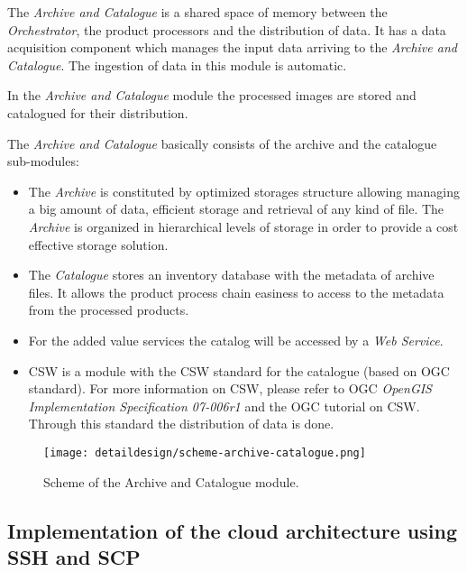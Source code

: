 The \emph{Archive and Catalogue} is a shared space of memory between the
\emph{Orchestrator}, the product processors and the distribution of data. It has
a data acquisition component which manages the input data arriving to the
\emph{Archive and Catalogue}. The ingestion of data in this module is automatic.

In the \emph{Archive and Catalogue} module the processed images are stored and catalogued for their distribution.

The \emph{Archive and Catalogue} basically consists of the archive and the
catalogue sub-modules:
\begin{itemize}
\item The \emph{Archive} is constituted by optimized storages structure allowing managing a big amount of data, efficient storage and retrieval of any kind of file. The \emph{Archive} is organized in hierarchical levels of storage in order to provide a cost effective storage solution.

\item The \emph{Catalogue} stores an inventory database with the metadata of archive files. It allows the product process chain easiness to access to the metadata from the processed products.

\item For the added value services the catalog will be accessed by a \emph{Web Service}.

\item \ac{CSW} is a module with the \ac{CSW} standard for the catalogue (based on \ac{OGC} standard). For more information on \ac{CSW}, please refer to \ac{OGC} \emph{OpenGIS Implementation Specification 07-006r1} and the \ac{OGC} tutorial on \ac{CSW}. Through this standard the distribution of data is done.
\end{itemize}

\begin{figure}[!h]
\begin{center}
\texttt{[image: detaildesign/scheme-archive-catalogue.png]}
\caption{Scheme of the Archive and Catalogue module.}
\label{fig:archive-catalogue-scheme}
\end{center}
\end{figure}



\subsection{Implementation of the cloud architecture using SSH and SCP}

